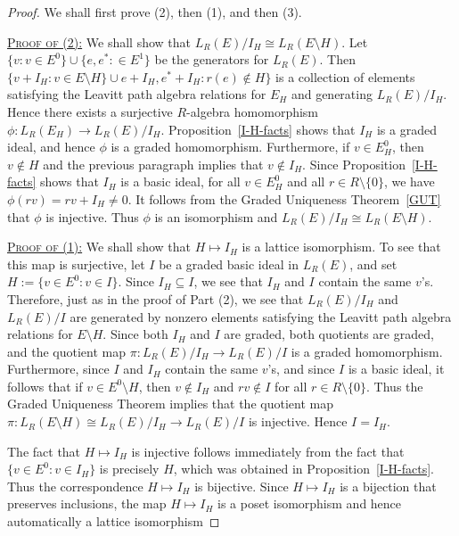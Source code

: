 \documentclass[11pt]{amsart}
\theoremstyle{remark}
\numberwithin{equation}{section}
\begin{document}
\begin{proof}
We shall first prove (2), then (1), and then (3).

\smallskip

\noindent \underline{\textsc{Proof of (2):}}  We shall show that $L_R(E) / I_H \cong L_R(E \setminus H)$.  Let $\{v : v \in E^0 \} \cup \{e, e^* : \in E^1\}$ be the generators for $L_R(E)$.  Then $\{ v + I_H : v \in E \setminus H \} \cup e+I_H, e^*+I_H : r(e) \notin H\}$ is a collection of elements satisfying the Leavitt path algebra relations for $E_H$ and generating $L_R(E)/I_H$.  Hence there exists a surjective $R$-algebra homomorphism $\phi : L_R(E_H) \to L_R(E)/I_H$.  Proposition~\ref{I-H-facts} shows that $I_H$ is a graded ideal, and hence $\phi$ is a  graded homomorphism.  Furthermore, if $v \in E^0_H$, then $v \notin H$ and the previous paragraph implies that $v \notin I_H$.  Since Proposition~\ref{I-H-facts} shows that $I_H$ is a basic ideal, for all $v \in E_H^0$ and all $r \in R \setminus \{ 0 \}$, we have $\phi (rv) = rv + I_H \neq 0$.  It follows from the Graded Uniqueness Theorem~\ref{GUT} that $\phi$ is injective.  Thus $\phi$ is an isomorphism and $L_R(E) / I_H \cong L_R(E \setminus H)$.


\smallskip

\noindent \underline{\textsc{Proof of (1):}}  We shall show that $H \mapsto I_H$ is a lattice
isomorphism.  To see that this map is surjective, let $I$ be a
graded basic ideal in $L_R(E)$, and set $H := \{v \in E^0
: v \in I\}$.  Since $I_H \subseteq I$, we see that $I_H$ and $I$
contain the same $v$'s.  Therefore, just as
in the proof of Part (2), we see that $L_R(E) /
I_H$ and $L_R(E) / I$ are generated by nonzero elements satisfying the Leavitt path algebra relations for 
$E \setminus H$.  Since both $I_H$ and $I$ are graded, both
quotients are graded, and the quotient map $\pi : L_R(E) / I_H \rightarrow L_R(E) / I$ is a graded homomorphism.  Furthermore, since $I$ and $I_H$ contain the same $v$'s, and since $I$ is a basic ideal, it follows that if $v \in E^0 \setminus H$, then $v \notin I_H$ and $rv \notin I$ for all $r \in R \setminus \{0 \}$.  Thus the Graded Uniqueness Theorem implies that the quotient map $\pi : L_R(E \setminus H) \cong
L_R(E) / I_H \rightarrow L_R(E) / I$ is injective.  Hence $I = I_H$.  

The fact that $H \mapsto I_H$ is injective
follows immediately from the fact that $\{ v \in E^0 : v \in I_H \}$ is precisely $H$, which was obtained in Proposition~\ref{I-H-facts}.  Thus the correspondence $H \mapsto I_H$ is bijective.  Since $H \mapsto I_H$ is a bijection that preserves inclusions, the map $H \mapsto I_H$ is a poset isomorphism and hence automatically a lattice isomorphism


\end{proof}
\end{document}
